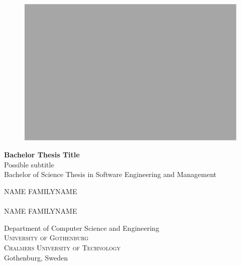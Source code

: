 \documentclass[12pt,a4paper,twoside,openright]{report}
\newcommand{\backgroundpic}[3]{
	\put(#1,#2){
	\parbox[b][\paperheight]{\paperwidth}{
	\centering
	\texttt{[image: \#3]}}}}
\begin{document}
 

\begin{titlepage}
			
\AddToShipoutPicture*{\backgroundpic{-4}{56.7}{frontpage_gu_eng_vec_m2.pdf}}
\addtolength{\voffset}{2cm}

\begin{figure}[H]
\centering
\vspace{1cm}	
\includegraphics[width=0.9\linewidth]{greybox.png}
\end{figure}

\mbox{}
\vfill
\renewcommand{\familydefault}{\sfdefault} \normalfont %

\textbf{\Huge Bachelor Thesis Title} 
\\[0.5cm]

{\Large Possible subtitle}\\[0.5cm]

Bachelor of Science Thesis in Software Engineering and Management \setlength{\parskip}{1cm}

{\Large NAME FAMILYNAME} \setlength{\parskip}{2.9cm} \\ \\
{\Large NAME FAMILYNAME} \setlength{\parskip}{2.9cm}

Department of Computer Science and Engineering \\
\textsc{University of Gothenburg} \\
\textsc{Chalmers University of Technology} \\
Gothenburg, Sweden \the\year

\renewcommand{\familydefault}{\rmdefault} \normalfont %
\end{titlepage}
\end{document}
